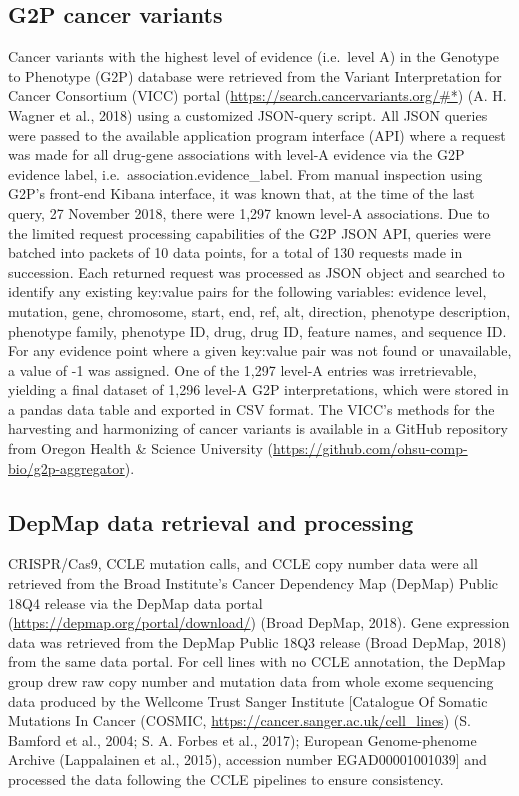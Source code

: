 \documentclass[man]{apa6}
\begin{document}
\subsection{G2P cancer variants}\label{g2p-cancer-variants}

Cancer variants with the highest level of evidence (i.e.~level A) in the
Genotype to Phenotype (G2P) database were retrieved from the Variant
Interpretation for Cancer Consortium (VICC) portal
(\url{https://search.cancervariants.org/\#*}) (A. H. Wagner et al.,
2018) using a customized JSON-query script. All JSON queries were passed
to the available application program interface (API) where a request was
made for all drug-gene associations with level-A evidence via the G2P
evidence label, i.e.~association.evidence\_label. From manual inspection
using G2P's front-end Kibana interface, it was known that, at the time
of the last query, 27 November 2018, there were 1,297 known level-A
associations. Due to the limited request processing capabilities of the
G2P JSON API, queries were batched into packets of 10 data points, for a
total of 130 requests made in succession. Each returned request was
processed as JSON object and searched to identify any existing key:value
pairs for the following variables: evidence level, mutation, gene,
chromosome, start, end, ref, alt, direction, phenotype description,
phenotype family, phenotype ID, drug, drug ID, feature names, and
sequence ID. For any evidence point where a given key:value pair was not
found or unavailable, a value of -1 was assigned. One of the 1,297
level-A entries was irretrievable, yielding a final dataset of 1,296
level-A G2P interpretations, which were stored in a pandas data table
and exported in CSV format. The VICC's methods for the harvesting and
harmonizing of cancer variants is available in a GitHub repository from
Oregon Health \& Science University
(\url{https://github.com/ohsu-comp-bio/g2p-aggregator}).

\subsection{DepMap data retrieval and
processing}\label{depmap-data-retrieval-and-processing}

CRISPR/Cas9, CCLE mutation calls, and CCLE copy number data were all
retrieved from the Broad Institute's Cancer Dependency Map (DepMap)
Public 18Q4 release via the DepMap data portal
(\url{https://depmap.org/portal/download/}) (Broad DepMap, 2018). Gene
expression data was retrieved from the DepMap Public 18Q3 release (Broad
DepMap, 2018) from the same data portal. For cell lines with no CCLE
annotation, the DepMap group drew raw copy number and mutation data from
whole exome sequencing data produced by the Wellcome Trust Sanger
Institute {[}Catalogue Of Somatic Mutations In Cancer (COSMIC,
\url{https://cancer.sanger.ac.uk/cell_lines}) (S. Bamford et al., 2004;
S. A. Forbes et al., 2017); European Genome-phenome Archive (Lappalainen
et al., 2015), accession number EGAD00001001039{]} and processed the
data following the CCLE pipelines to ensure consistency.
\end{document}
